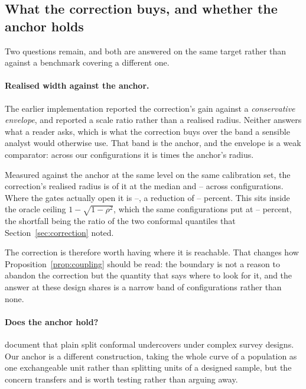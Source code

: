 \subsection{What the correction buys, and whether the anchor holds}
\label{sec:widths}

Two questions remain, and both are answered on the same target rather than
against a benchmark covering a different one.

\paragraph{Realised width against the anchor.} The earlier implementation reported
the correction's gain against a \emph{conservative envelope}, and reported a
scale ratio rather than a realised radius. Neither answers what a reader asks, which
is what the correction buys over the band a sensible analyst would otherwise
use. That band is the anchor, and the envelope is a weak comparator: across our
configurations it is \WidConsMed{} times the anchor's radius.

Measured against the anchor at the same level on the same calibration set, the
correction's realised radius is \WidMed{} of it at the median and
\WidLo--\WidHi{} across configurations. Where the gates actually open it is
\WidActLo--\WidActHi, a reduction of \WidGainLo--\WidGainHi{} percent. This sits
inside the oracle ceiling $1-\sqrt{1-\rho^2}$, which the same configurations put
at \WidCeilLo--\WidCeilHi{} percent, the shortfall being the ratio of the two
conformal quantiles that Section~\ref{sec:correction} noted.

The correction is therefore worth having where it is reachable. That changes how
Proposition~\ref{prop:coupling} should be read: the boundary is not a reason to
abandon the correction but the quantity that says where to look for it, and the
answer at these design shares is a narrow band of configurations rather than
none.

\paragraph{Does the anchor hold?} \citet{michal2024model} document that plain
split conformal undercovers under complex survey designs. Our anchor is a
different construction, taking the whole curve of a population as one
exchangeable unit rather than splitting units of a designed sample, but the
concern transfers and is worth testing rather than arguing away.

